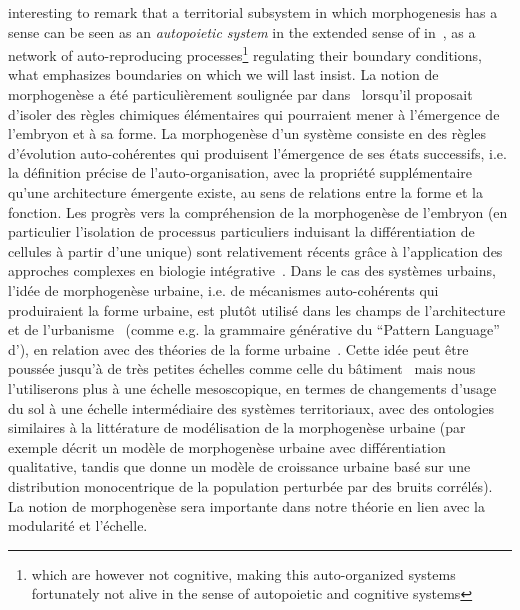 {interesting to remark that a territorial subsystem in which morphogenesis has a sense can be seen as an \emph{autopoietic system} in the extended sense of  in~\cite{bourgine2004autopoiesis}, as a network of auto-reproducing processes\footnote{which are however not cognitive, making this auto-organized systems fortunately not alive in the sense of autopoietic and cognitive systems} regulating their boundary conditions, what emphasizes boundaries on which we will last insist.
}{
La notion de morphogenèse a été particulièrement soulignée par  dans~\cite{turing1952chemical} lorsqu'il proposait d'isoler des règles chimiques élémentaires qui pourraient mener à l'émergence de l'embryon et à sa forme. La morphogenèse d'un système consiste en des règles d'évolution auto-cohérentes qui produisent l'émergence de ses états successifs, i.e. la définition précise de l'auto-organisation, avec la propriété supplémentaire qu'une architecture émergente existe, au sens de relations entre la forme et la fonction. Les progrès vers la compréhension de la morphogenèse de l'embryon (en particulier l'isolation de processus particuliers induisant la différentiation de cellules à partir d'une unique) sont relativement récents grâce à l'application des approches complexes en biologie intégrative~\cite{delile2016chapitre}. Dans le cas des systèmes urbains, l'idée de morphogenèse urbaine, i.e. de mécanismes auto-cohérents qui produiraient la forme urbaine, est plutôt utilisé dans les champs de l'architecture et de l'urbanisme~\cite{hachi2013master} (comme e.g. la grammaire générative du ``Pattern Language'' d'), en relation avec des théories de la forme urbaine~\cite{moudon1997urban}. Cette idée peut être poussée jusqu'à de très petites échelles comme celle du bâtiment~\cite{whitehand1999urban} mais nous l'utiliserons plus à une échelle mesoscopique, en termes de changements d'usage du sol à une échelle intermédiaire des systèmes territoriaux, avec des ontologies similaires à la littérature de modélisation de la morphogenèse urbaine (par exemple \cite{bonin2012modele} décrit un modèle de morphogenèse urbaine avec différentiation qualitative, tandis que \cite{makse1998modeling} donne un modèle de croissance urbaine basé sur une distribution monocentrique de la population perturbée par des bruits corrélés). La notion de morphogenèse sera importante dans notre théorie en lien avec la modularité et l'échelle. 
}
